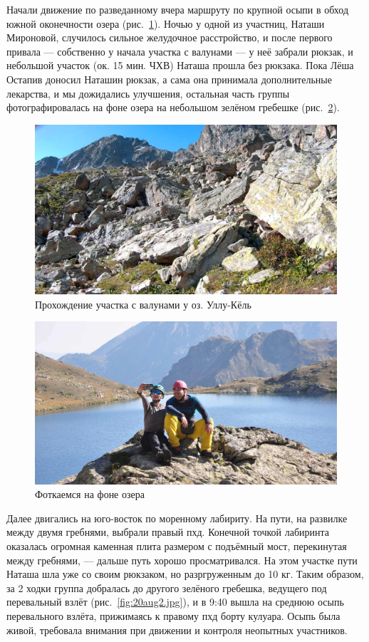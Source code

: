 Начали движение по разведанному вчера маршруту по крупной осыпи в обход южной оконечности озера (рис.~\ref{ullu_koel_lake_stones}). Ночью у одной из участниц, Наташи Мироновой, случилось сильное желудочное расстройство, и после первого  привала --- собственно у начала участка с валунами --- у неё забрали рюкзак, и небольшой участок (ок. 15 мин. ЧХВ) Наташа прошла без рюкзака. Пока Лёша Остапив доносил Наташин рюкзак, а сама она принимала дополнительные лекарства, и мы дожидались улучшения, остальная часть группы фотографировалась на фоне озера на небольшом зелёном гребешке (рис.~\ref{fig:DSC_0907}).
\begin{figure}[h!]
	\centering
	\includegraphics[width=0.7\linewidth]{../pics/ullu_koel_lake_stones.jpg}
	\caption{Прохождение участка с валунами у оз. Уллу-Кёль}
	\label{ullu_koel_lake_stones}
\end{figure}

 
 \begin{figure}[h!]
 	\centering
 	\includegraphics[width=0.7\linewidth]{../pics/DSC_0907}
 	\caption{Фоткаемся на фоне озера}
 	\label{fig:DSC_0907}
 \end{figure}
 

Далее двигались на юго-восток по моренному лабириту. На пути, на развилке между двумя гребнями, выбрали правый пхд. Конечной точкой лабиринта оказалась огромная каменная плита размером с подъёмный мост, перекинутая между гребнями, --- дальше путь хорошо просматривался. На этом участке пути Наташа шла уже со своим рюкзаком, но разргруженным до 10 кг. Таким образом, за 2 ходки группа добралась до другого зелёного гребешка, ведущего под перевальный взлёт (рис.~\ref{fig:20aug2.jpg}), и в 9:40 вышла на среднюю осыпь перевального взлёта, прижимаясь к правому пхд борту кулуара. Осыпь была живой, требовала внимания при движении и контроля неопытных участников.

